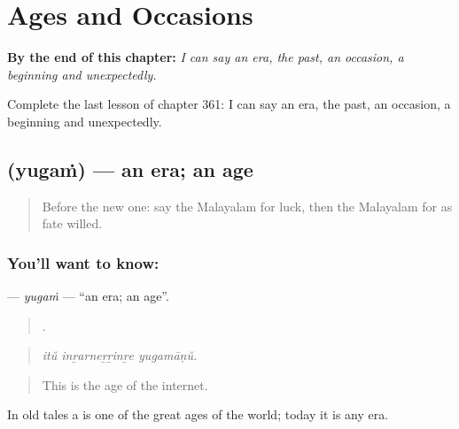 
\chapter{Ages and Occasions}
\label{ch:ml-ages-and-occasions}

\begin{chapteropening}
\textbf{By the end of this chapter:} \emph{I can say an era, the past, an occasion, a beginning and unexpectedly.}

Complete the last lesson of chapter 361: I can say an era, the past, an occasion, a beginning and unexpectedly.
\end{chapteropening}

\section[\texorpdfstring{\ml{യുഗം} (yugaṁ)}{യുഗം (yugaṁ)}]{ (yugaṁ) — an era; an age}

\label{lesson:ML-C361-yugam}



\begin{quote}
Before the new one: say the Malayalam for luck, then the Malayalam for as fate willed.
\end{quote}

\subsection*{You'll want to know: }
\textbf{} — \emph{yugaṁ} — \textquotedblleft{}an era; an age\textquotedblright{}.

\begin{quote}
  .
\end{quote}

\begin{quote}
\emph{itŭ inṟarneṟṟinṟe yugamāṇŭ.}
\end{quote}

\begin{quote}
This is the age of the internet.
\end{quote}

In old tales a  is one of the great ages of the world; today it is any era.

